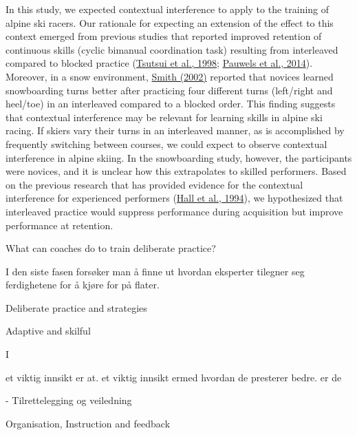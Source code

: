 \documentclass[letterpaper,10pt]{article}
\begin{document}
In this study, we expected contextual interference to apply to the training of alpine ski racers. Our rationale for expecting an extension of the effect to this context emerged from previous studies that reported improved retention of continuous skills (cyclic bimanual coordination task) resulting from interleaved compared to blocked practice (\href{https://www.frontiersin.org/articles/10.3389/fbioe.2022.966041/full\#B48}{Tsutsui et al., 1998}; \href{https://www.frontiersin.org/articles/10.3389/fbioe.2022.966041/full\#B31}{Pauwels et al., 2014}). Moreover, in a snow environment, \href{https://www.frontiersin.org/articles/10.3389/fbioe.2022.966041/full\#B42}{Smith (2002)} reported that novices learned snowboarding turns better after practicing four different turns (left/right and heel/toe) in an interleaved compared to a blocked order. This finding suggests that contextual interference may be relevant for learning skills in alpine ski racing. If skiers vary their turns in an interleaved manner, as is accomplished by frequently switching between courses, we could expect to observe contextual interference in alpine skiing. In the snowboarding study, however, the participants were novices, and it is unclear how this extrapolates to skilled performers. Based on the previous research that has provided evidence for the contextual interference for experienced performers (\href{https://www.frontiersin.org/articles/10.3389/fbioe.2022.966041/full\#B17}{Hall et al., 1994}), we hypothesized that interleaved practice would suppress performance during acquisition but improve performance at retention.

 



What can coaches do to train deliberate practice?






I den siste fasen forsøker man å finne ut hvordan eksperter tilegner seg ferdighetene for å kjøre for på flater. 


Deliberate practice and strategies

Adaptive and skilful

I





et viktig innsikt er at. et viktig innsikt ermed hvordan de presterer bedre. er de


- Tilrettelegging og veiledning


Organisation, Instruction and feedback
\end{document}
